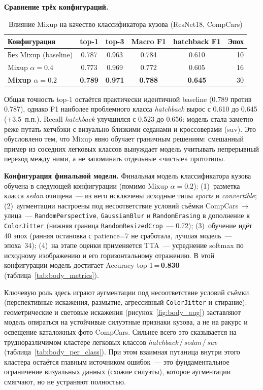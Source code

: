 \documentclass[10pt,a4paper]{report}
\numberwithin{equation}{chapter}
\numberwithin{figure}{chapter}
\numberwithin{table}{chapter}
\begin{document}
\textbf{Сравнение трёх конфигураций.}

\begin{table}[H]
\centering
\caption{Влияние Mixup на качество классификатора кузова (ResNet18, CompCars)}
\label{tab:mixup_ablation}
\begin{tabular}{lccccr}
\toprule
\textbf{Конфигурация} & \textbf{top-1} & \textbf{top-3} & \textbf{Macro F1} & \textbf{hatchback F1} & \textbf{Эпох} \\
\midrule
Без Mixup (baseline)   & 0.787 & 0.963 & 0.784 & 0.610 & 10 \\
Mixup $\alpha=0.4$     & 0.773 & 0.969 & 0.772 & 0.605 & 16 \\
\textbf{Mixup $\alpha=0.2$} & \textbf{0.789} & \textbf{0.971} & \textbf{0.788} & \textbf{0.645} & 30 \\
\bottomrule
\end{tabular}
\end{table}

Общая точность top-1 остаётся практически идентичной baseline (0.789 против 0.787),
однако F1 наиболее проблемного класса \textit{hatchback} вырос
с 0.610 до 0.645 ($+3.5$~п.п.). Recall \textit{hatchback} улучшился с 0.523
до 0.656: модель стала заметно реже путать хетчбэки с визуально близкими
седанами и кроссоверами (suv).
Это обусловлено тем, что Mixup явно обучает граничным решениям:
смешанный пример из соседних легковых классов вынуждает модель учитывать
непрерывный переход между ними, а не запоминать отдельные
«чистые» прототипы.

\textbf{Конфигурация финальной модели.}
Финальная модель классификатора кузова обучена в следующей конфигурации
(помимо Mixup $\alpha=0.2$): (1)~разметка класса \textit{sedan} очищена~---
из него исключены исходные типы \textit{sports} и \textit{convertible};
(2)~аугментации настроены под несоответствие условий съёмки
CompCars\,$\to$\,улица~--- \texttt{RandomPerspective}, \texttt{GaussianBlur}
и \texttt{RandomErasing} в дополнение к \texttt{ColorJitter} (нижняя граница
\texttt{RandomResizedCrop}~--- 0.72);
(3)~обучение идёт 40 эпох (ранняя остановка с patience=7 не сработала,
лучшая модель~--- эпоха~34);
(4)~на этапе оценки применяется TTA~--- усреднение softmax по исходному
изображению и его горизонтальному отражению. В этой конфигурации модель
достигает Accuracy top-1\,=\,\textbf{0.830} (таблица~\ref{tab:body_metrics}).

Ключевую роль здесь играют аугментации под несоответствие условий съёмки
(перспективные искажения, размытие, агрессивный \texttt{ColorJitter} и
стирание): геометрические и световые искажения
(рисунок~\ref{fig:body_aug}) заставляют модель опираться на устойчивые
силуэтные признаки кузова, а не на ракурс и освещение каталожных фото
CompCars. Сильнее всего это сказывается на трудноразличимом кластере
легковых классов \textit{hatchback}\,/\,\textit{sedan}\,/\,\textit{suv}
(таблица~\ref{tab:body_per_class}). При этом взаимная путаница внутри
этого кластера остаётся главным источником ошибок~--- это
фундаментальное ограничение визуальных данных (схожие силуэты), которое
аугментации смягчают, но не устраняют полностью.
\end{document}
